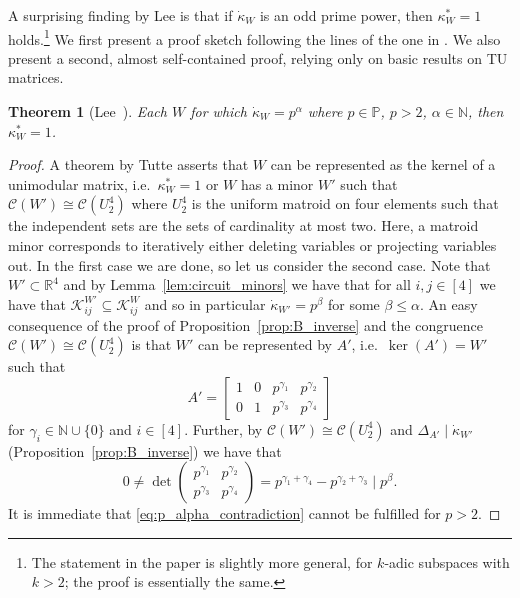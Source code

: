 \documentclass[11pt, a4paper]{article}
\newcommand{\circuits}{\mathcal{C}}
\newcommand{\1}{\mathbbm{1}}
\newcommand{\primes}{\mathbb{P}}
\newcommand{\divides}{\mid}
\newtheorem{theorem}{Theorem}[section]
\theoremstyle{case}
\newcommand{\R}{\mathbb{R}}
\newcommand{\N}{\mathbb{N}}
\begin{document}
A surprising finding by Lee \cite{Lee89,Lee90} is that if $\dot\kappa_W$ is an odd prime power, then $\kappa^*_W=1$ holds.\footnote{The statement in the paper is slightly more general, for $k$-adic subspaces with $k>2$; the proof is essentially the same.}
We first present a proof sketch following the lines of the one in \cite{Lee89,Lee90}.
We also present a second, almost self-contained proof,  relying only on basic results on TU matrices. \begin{theorem}[{Lee~\cite{Lee89,Lee90}}]\label{thm:kappa-star}
Each $W$ for which $\dot{\kappa}_W = p^\alpha$ where $p\in\primes$, $p>2$,  $\alpha\in \N$, then  $\kappa^*_W = 1$.
\end{theorem}

\begin{proof}
A theorem by Tutte \cite{Tutte1965} asserts that $W$ can be represented as the kernel of a unimodular matrix, i.e.\ $\kappa^*_W = 1$ or $W$ has a minor $W'$ such that $\circuits(W') \cong \circuits(U_2^4)$ where $U_2^4$ is the uniform matroid on four elements such that the independent sets are the sets of cardinality at most two. Here, a matroid minor corresponds to iteratively either deleting variables or projecting variables out. In the first case we are done, so let us consider the second case. Note that $W' \subset \R^4$ and by Lemma~\ref{lem:circuit_minors} we have that for all $i,j \in [4]$ we have that $\mathcal K_{ij}^{W'} \subseteq \mathcal K_{ij}^W$ and so in particular $\dot \kappa_{W'} = p^\beta$ for some $\beta \le \alpha$. An easy consequence of the proof of Proposition~\ref{prop:B_inverse} and the congruence $\circuits(W') \cong \circuits(U_2^4)$ is that $W'$ can be represented by $A'$, i.e.\ $\ker(A') = W'$ such that 
\begin{equation}
  A' = 
  \begin{bmatrix}
    1 & 0 & p^{\gamma_1} & p^{\gamma_2} \\
    0 & 1 & p^{\gamma_3} & p^{\gamma_4}
  \end{bmatrix}
\end{equation}  
for $\gamma_i \in \N \cup \{0\}$ and $i \in [4]$. Further, by $\circuits(W') \cong \circuits(U_2^4)$ and $\Delta_{A'} \divides \dot \kappa_{W'}$ (Proposition~\ref{prop:B_inverse}) we have that 
\begin{equation}
  \label{eq:p_alpha_contradiction}
  0 \neq \det\begin{pmatrix}
     p^{\gamma_1} & p^{\gamma_2} \\
     p^{\gamma_3} & p^{\gamma_4}
  \end{pmatrix} = p^{\gamma_1 + \gamma_4} - p^{\gamma_2 + \gamma_3} \divides p^\beta.
\end{equation}
It is immediate that \eqref{eq:p_alpha_contradiction} cannot be fulfilled for $p > 2$. 
\end{proof}
\end{document}
